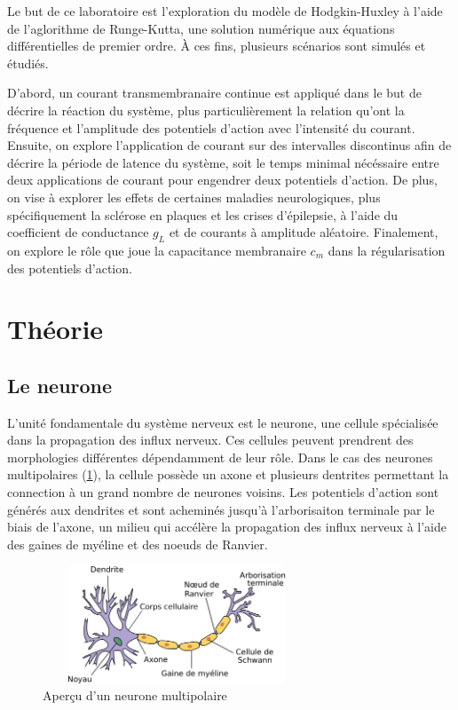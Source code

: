 \documentclass{article}
\begin{document}
Le but de ce laboratoire est l'exploration du modèle de Hodgkin-Huxley à l'aide de l'aglorithme de Runge-Kutta, une solution numérique aux équations différentielles de premier ordre. À ces fins, plusieurs scénarios sont simulés et étudiés. 

D'abord, un courant transmembranaire continue est appliqué dans le but de décrire la réaction du système, plus particulièrement la relation qu'ont la fréquence et l'amplitude des potentiels d'action avec l'intensité du courant. Ensuite, on explore l'application de courant sur des intervalles discontinus afin de décrire la période de latence du système, soit le temps minimal nécéssaire entre deux applications de courant pour engendrer deux potentiels d'action. De plus, on vise à explorer les effets de certaines maladies neurologiques, plus spécifiquement la sclérose en plaques et les crises d'épilepsie, à l'aide du coefficient de conductance $g_L$ et de courants à amplitude aléatoire. Finalement, on explore le rôle que joue la capacitance membranaire $c_m$ dans la régularisation des potentiels d'action.

\section{Théorie}\label{sec:theorie}

\subsection{Le neurone}

L'unité fondamentale du système nerveux est le neurone, une cellule spécialisée dans la propagation des influx nerveux. Ces cellules peuvent prendrent des morphologies différentes dépendamment de leur rôle. Dans le cas des neurones multipolaires (\ref{fig:neurone}), la cellule possède un axone et plusieurs dentrites permettant la connection à un grand nombre de neurones voisins. Les potentiels d'action sont générés aux dendrites et sont acheminés jusqu'à l'arborisaiton terminale par le biais de l'axone, un milieu qui accélère la propagation des influx nerveux à l'aide des gaines de myéline et des noeuds de Ranvier.

\begin{figure}[H]
	\centering
	\includegraphics[width=8cm, height=3.5cm]{neurone.png}
	\caption{Aperçu d'un neurone multipolaire}
	\label{fig:neurone}
\end{figure}
\end{document}

